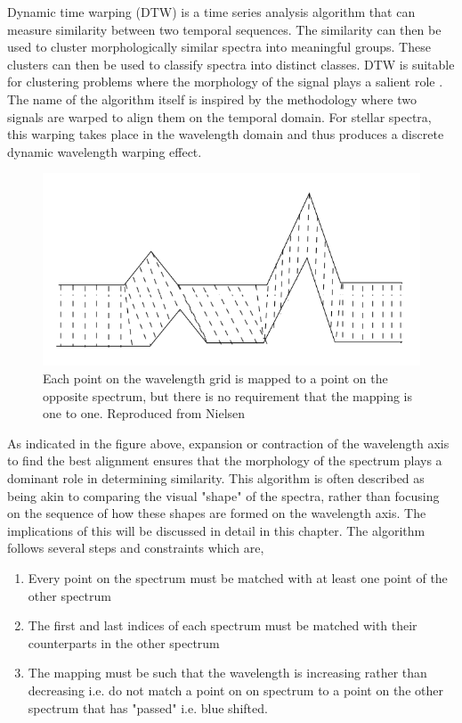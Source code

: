 Dynamic time warping (DTW) is a time series analysis algorithm that can measure similarity between two temporal sequences. The similarity can then be used to cluster morphologically similar spectra into meaningful groups. These clusters can then be used to classify spectra into distinct classes. DTW is suitable for clustering problems where the morphology of the signal plays a salient role \cite{nielsen2019practical}. The name of the algorithm itself is inspired by the methodology where two signals are warped to align them on the temporal domain. For stellar spectra, this warping takes place in the wavelength domain and thus produces a discrete dynamic wavelength warping effect.

\begin{figure}[h]
\centering
\includegraphics[scale=0.90]{figures/Dynamic_time_warping.png}
\caption{Each point on the wavelength grid is mapped to a point on the opposite spectrum, but there is no requirement that the mapping is one to one. Reproduced from Nielsen \cite{nielsen2019practical}}
\end{figure}

As indicated in the figure above, expansion or contraction of the wavelength axis to find the best alignment ensures that the morphology of the spectrum plays a dominant role in determining similarity. This algorithm is often described as being akin to comparing the visual "shape" of the spectra, rather than focusing on the sequence of how these shapes are formed on the wavelength axis. The implications of this will be discussed in detail in this chapter. The algorithm follows several steps and constraints which are,

\begin{enumerate}
    \item Every point on the spectrum must be matched with at least one point of the other spectrum
    \item The first and last indices of each spectrum must be matched with their counterparts in the other spectrum
    \item The mapping must be such that the wavelength is increasing rather than decreasing i.e. do not match a point on on spectrum to a point on the other spectrum that has "passed" i.e. blue shifted. 
\end{enumerate}

